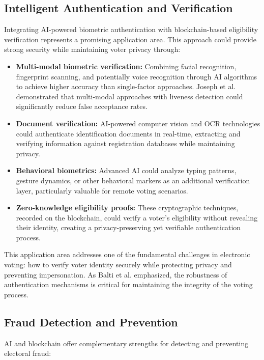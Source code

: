 \documentclass[conference]{IEEEtran}
\begin{document}
\subsection{Intelligent Authentication and Verification}
Integrating AI-powered biometric authentication with blockchain-based eligibility verification represents a promising application area. This approach could provide strong security while maintaining voter privacy through:

\begin{itemize}
    \item \textbf{Multi-modal biometric verification:} Combining facial recognition, fingerprint scanning, and potentially voice recognition through AI algorithms to achieve higher accuracy than single-factor approaches. Joseph et al. \cite{b6} demonstrated that multi-modal approaches with liveness detection could significantly reduce false acceptance rates.
    
    \item \textbf{Document verification:} AI-powered computer vision and OCR technologies could authenticate identification documents in real-time, extracting and verifying information against registration databases while maintaining privacy.
    
    \item \textbf{Behavioral biometrics:} Advanced AI could analyze typing patterns, gesture dynamics, or other behavioral markers as an additional verification layer, particularly valuable for remote voting scenarios.
    
    \item \textbf{Zero-knowledge eligibility proofs:} These cryptographic techniques, recorded on the blockchain, could verify a voter's eligibility without revealing their identity, creating a privacy-preserving yet verifiable authentication process.
\end{itemize}

This application area addresses one of the fundamental challenges in electronic voting: how to verify voter identity securely while protecting privacy and preventing impersonation. As Balti et al. \cite{b2} emphasized, the robustness of authentication mechanisms is critical for maintaining the integrity of the voting process.

\subsection{Fraud Detection and Prevention}
AI and blockchain offer complementary strengths for detecting and preventing electoral fraud:
\end{document}
